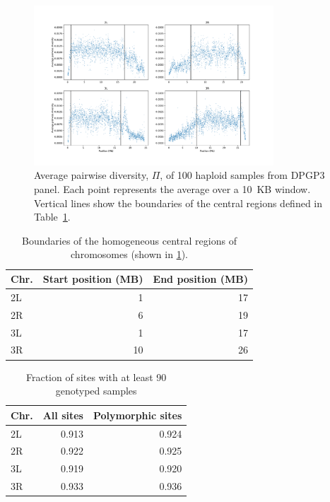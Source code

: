 \documentclass[11pt, letterpaper]{article}   	%
\begin{document}
\begin{figure}[h!]
\centering
\includegraphics[width=0.8\textwidth]{figures/pi_vs_position.pdf}
\caption{Average pairwise diversity, $\Pi$, of 100 haploid samples from DPGP3 panel. Each point represents the average over a 10~KB window. Vertical lines show the boundaries of the central regions defined in Table~\ref{tab:central_regions}.
\label{fig:dpgp_pi}}
\end{figure}

\begin{table}[h!]
  \begin{center}
    \caption{Boundaries of the homogeneous central regions of chromosomes (shown in \ref{fig:dpgp_pi}).}
    \label{tab:central_regions}
    \begin{tabular}{l|r|r} %
      \textbf{Chr.} & \textbf{Start position (MB)} & \textbf{End position (MB)}\\
      \hline
      2L & 1 & 17\\
      2R & 6 & 19\\
      3L & 1 & 17\\
      3R & 10 & 26
    \end{tabular}
  \end{center}
\end{table}

\begin{table}[h!]
  \begin{center}
    \caption{Fraction of sites with at least 90 genotyped samples}
    \label{tab:called_sites}
    \begin{tabular}{l|r|r} %
      \textbf{Chr.} & \textbf{All sites} & \textbf{Polymorphic sites}\\
      \hline
      2L & 0.913 & 0.924 \\
      2R & 0.922 & 0.925 \\
      3L & 0.919 & 0.920 \\
      3R & 0.933 & 0.936
    \end{tabular}
  \end{center}
\end{table}
\end{document}
